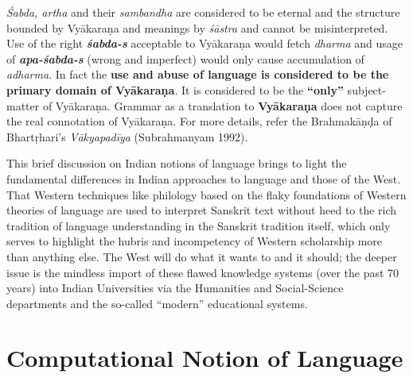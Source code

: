 \textit{Śabda, artha} and their \textit{sambandha} are considered to be eternal and the structure bounded by Vyākaraṇa and meanings by \textit{śāstra} and cannot be misinterpreted. Use of the right \textbf{\textit{śabda-s}} acceptable to Vyākaraṇa would fetch \textit{dharma} and usage of \textbf{\textit{apa-śabda-s}} (wrong and imperfect) would only cause accumulation of \textit{adharma}. In fact the \textbf{use and abuse of language is considered to be the primary domain of Vyākaraṇa}. It is considered to be the \textbf{“only”} subject-matter of Vyākaraṇa. Grammar as a translation to \textbf{Vyākaraṇa} does not capture the real connotation of Vyākaraṇa. For more details, refer the Brahmakāṇḍa of Bhartṛhari’s \textit{Vākyapadīya} (Subrahmanyam 1992).

This brief discussion on Indian notions of language brings to light the fundamental differences in Indian approaches to language and those of the West. That Western techniques like philology based on the flaky foundations of Western theories of language are used to interpret Sanskrit text without heed to the rich tradition of language understanding in the Sanskrit tradition itself, which only serves to highlight the hubris and incompetency of Western scholarship more than anything else. The West will do what it wants to and it should; the deeper issue is the mindless import of these flawed knowledge systems (over the past 70 years) into Indian Universities via the Humanities and Social-Science departments and the so-called “modern” educational systems.

\section*{Computational Notion of Language}

